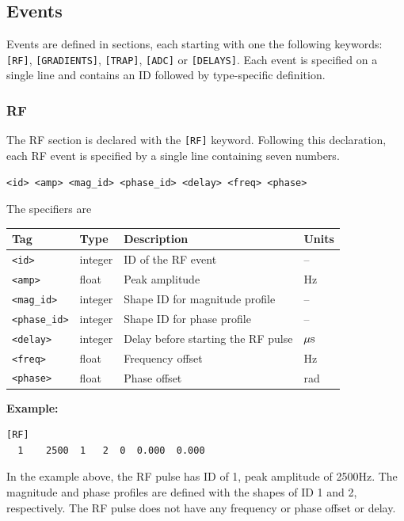 \documentclass{article}
\begin{document}
\subsection{Events}

Events are defined in sections, each starting with one the following keywords: \verb.[RF]., \verb.[GRADIENTS]., \verb.[TRAP]., \verb.[ADC]. or \verb.[DELAYS].. Each event is specified on a single line and contains an ID followed by type-specific definition.

\subsubsection{RF}
The RF section is declared with the \verb.[RF]. keyword. Following this declaration, each RF event is specified by a single line containing seven numbers.
\begin{lstlisting}
<id> <amp> <mag_id> <phase_id> <delay> <freq> <phase>
\end{lstlisting}

The specifiers are

\begin{tabularx}{\textwidth}{llXl}
\toprule
Tag & Type & Description & Units\\
\midrule
\verb.<id>. & integer & ID of the RF event & -- \\
\verb.<amp>. & float & Peak amplitude & Hz \\
\verb.<mag_id>. & integer & Shape ID for magnitude profile & -- \\
\verb.<phase_id>. & integer & Shape ID for phase profile & --\\
\verb.<delay>. & integer & Delay before starting the RF pulse & $\rm \mu s$\\
\verb.<freq>. & float & Frequency offset & Hz \\
\verb.<phase>. & float & Phase offset & rad \\
\bottomrule
\end{tabularx}

\begin{minipage}{\textwidth}
\textbf{Example:}
\begin{lstlisting}
[RF]
  1    2500  1   2  0  0.000  0.000
\end{lstlisting}
\end{minipage}

In the example above, the RF pulse has ID of 1, peak amplitude of 2500Hz. The magnitude and phase profiles are defined with the shapes of ID 1 and 2, respectively. The RF pulse does not have any frequency or phase offset or delay.
\end{document}
